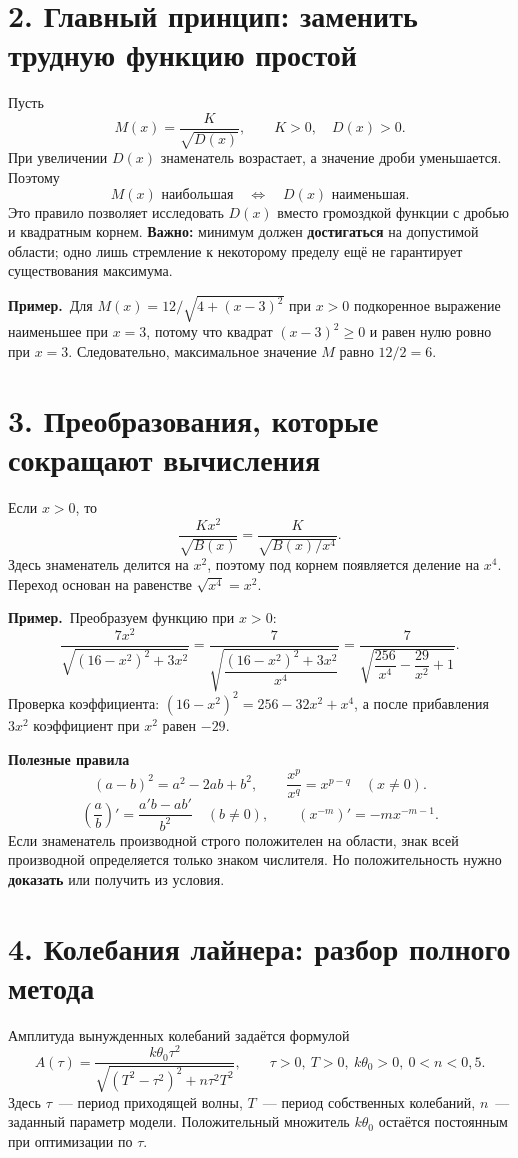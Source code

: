 \documentclass[a4paper,12pt]{article}
\newcommand{\key}[1]{\textcolor{darkaccent}{\textbf{#1}}}
\newcommand{\ex}[1]{\textbf{Пример.}~#1}
\begin{document}
\section*{2. Главный принцип: заменить трудную функцию простой}
Пусть
\[
M(x)=\frac{K}{\sqrt{D(x)}},\qquad K>0,\quad D(x)>0.
\]
При увеличении $D(x)$ знаменатель возрастает, а значение дроби уменьшается. Поэтому
\[
\boxed{\quad M(x)\text{ наибольшая}\quad\Longleftrightarrow\quad D(x)\text{ наименьшая}.\quad}
\]
Это правило позволяет исследовать $D(x)$ вместо громоздкой функции с дробью и квадратным корнем. \textbf{Важно:} минимум должен \textbf{достигаться} на допустимой области; одно лишь стремление к некоторому пределу ещё не гарантирует существования максимума.

\ex{Для $M(x)=12/\sqrt{4+(x-3)^2}$ при $x>0$ подкоренное выражение наименьшее при $x=3$, потому что квадрат $(x-3)^2\ge 0$ и равен нулю ровно при $x=3$. Следовательно, максимальное значение $M$ равно $12/2=6$.}

\section*{3. Преобразования, которые сокращают вычисления}
Если $x>0$, то
\[
\frac{Kx^2}{\sqrt{B(x)}}
=\frac{K}{\sqrt{B(x)/x^4}}.
\]
Здесь знаменатель делится на $x^2$, поэтому под корнем появляется деление на $x^4$. Переход основан на равенстве $\sqrt{x^4}=x^2$.

\ex{Преобразуем функцию при $x>0$:}
\[
\frac{7x^2}{\sqrt{(16-x^2)^2+3x^2}}
=\frac{7}{\sqrt{\dfrac{(16-x^2)^2+3x^2}{x^4}}}
=\frac{7}{\sqrt{\dfrac{256}{x^4}-\dfrac{29}{x^2}+1}}.
\]
Проверка коэффициента: $(16-x^2)^2=256-32x^2+x^4$, а после прибавления $3x^2$ коэффициент при $x^2$ равен $-29$.

\key{Полезные правила}
\[
(a-b)^2=a^2-2ab+b^2,\qquad
\frac{x^p}{x^q}=x^{p-q}\quad(x\ne 0).
\]
\[
\left(\frac{a}{b}\right)'=\frac{a'b-ab'}{b^2}\quad(b\ne0),\qquad
(x^{-m})'=-m x^{-m-1}.
\]
Если знаменатель производной строго положителен на области, знак всей производной определяется только знаком числителя. Но положительность нужно \textbf{доказать} или получить из условия.

\clearpage
\section*{4. Колебания лайнера: разбор полного метода}
Амплитуда вынужденных колебаний задаётся формулой
\[
A(\tau)=\frac{k\theta_0\tau^2}
{\sqrt{(T^2-\tau^2)^2+n\tau^2T^2}},
\qquad \tau>0,\ T>0,\ k\theta_0>0,\ 0<n<0{,}5.
\]
Здесь $\tau$~--- период приходящей волны, $T$~--- период собственных колебаний, $n$~--- заданный параметр модели. Положительный множитель $k\theta_0$ остаётся постоянным при оптимизации по $\tau$.
\end{document}
